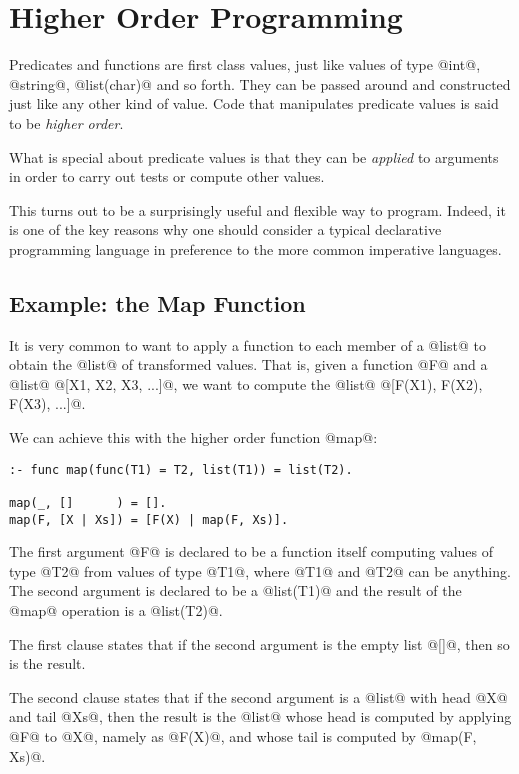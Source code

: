 \section{Higher Order Programming}

Predicates and functions are first class values, just like values of
type @int@, @string@, @list(char)@ and so forth.  They can be
passed around and constructed just like any other kind of value.  Code
that manipulates predicate values is said to be \emph{higher order}.


What is special about predicate values is that they can be
\emph{applied} to arguments in order to carry out tests or compute other
values.

This turns out to be a surprisingly useful and flexible way to program.
Indeed, it is one of the key reasons why one should consider a typical
declarative programming language in preference to the more common
imperative languages.

\subsection{Example: the Map Function}

It is very common to want to apply a function to each member of a @list@
to obtain the @list@ of transformed values.  That is, given a function
@F@ and a @list@ @[X1, X2, X3, ...]@, we want to compute the @list@
@[F(X1), F(X2), F(X3), ...]@.

We can achieve this with the higher order function @map@:
\begin{verbatim}
:- func map(func(T1) = T2, list(T1)) = list(T2).

map(_, []      ) = [].
map(F, [X | Xs]) = [F(X) | map(F, Xs)].
\end{verbatim}
The first argument @F@ is declared to be a function itself computing
values of type @T2@ from values of type @T1@, where @T1@ and @T2@ can be
anything.  The second argument is declared to be a @list(T1)@ and the
result of the @map@ operation is a @list(T2)@.

The first clause states that if the second argument is the empty list
@[]@, then so is the result.

The second clause states that if the second argument is a @list@ with head
@X@ and tail @Xs@, then the result is the @list@ whose head is computed by
applying @F@ to @X@, namely as @F(X)@, and whose tail is computed by
@map(F, Xs)@.

